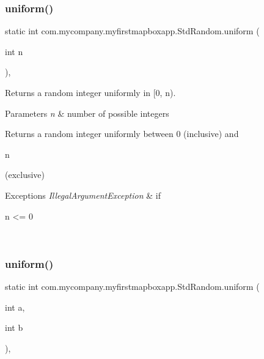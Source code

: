 \subsubsection{\texorpdfstring{uniform()}{uniform()}\hspace{0.1cm}{\footnotesize\ttfamily [2/4]}}
{\footnotesize\ttfamily static int com.\+mycompany.\+myfirstmapboxapp.\+Std\+Random.\+uniform (\begin{DoxyParamCaption}\item[{int}]{n }\end{DoxyParamCaption})\hspace{0.3cm}{\ttfamily [inline]}, {\ttfamily [static]}}

Returns a random integer uniformly in \mbox{[}0, n).


\begin{DoxyParams}{Parameters}
{\em n} & number of possible integers \\
\hline
\end{DoxyParams}
\begin{DoxyReturn}{Returns}
a random integer uniformly between 0 (inclusive) and
\begin{DoxyCode}
n 
\end{DoxyCode}
 (exclusive) 
\end{DoxyReturn}

\begin{DoxyExceptions}{Exceptions}
{\em Illegal\+Argument\+Exception} & if
\begin{DoxyCode}
n <= 0 
\end{DoxyCode}
 \\
\hline
\end{DoxyExceptions}
\mbox{\label{classcom_1_1mycompany_1_1myfirstmapboxapp_1_1_std_random_a6bcc5574e398d062f6a31f8374a49cbc}} 
\subsubsection{\texorpdfstring{uniform()}{uniform()}\hspace{0.1cm}{\footnotesize\ttfamily [3/4]}}
{\footnotesize\ttfamily static int com.\+mycompany.\+myfirstmapboxapp.\+Std\+Random.\+uniform (\begin{DoxyParamCaption}\item[{int}]{a,  }\item[{int}]{b }\end{DoxyParamCaption})\hspace{0.3cm}{\ttfamily [inline]}, {\ttfamily [static]}}

